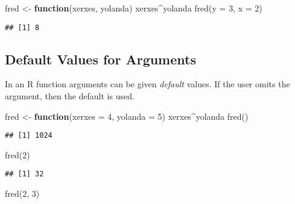\documentclass[
]{article}
\newenvironment{Shaded}{\begin{snugshade}}{\end{snugshade}}
\newcommand{\AttributeTok}[1]{\textcolor[rgb]{0.77,0.63,0.00}{#1}}
\newcommand{\ControlFlowTok}[1]{\textcolor[rgb]{0.13,0.29,0.53}{\textbf{#1}}}
\newcommand{\DecValTok}[1]{\textcolor[rgb]{0.00,0.00,0.81}{#1}}
\newcommand{\FunctionTok}[1]{\textcolor[rgb]{0.00,0.00,0.00}{#1}}
\newcommand{\NormalTok}[1]{#1}
\newcommand{\OtherTok}[1]{\textcolor[rgb]{0.56,0.35,0.01}{#1}}
\newcommand{\SpecialCharTok}[1]{\textcolor[rgb]{0.00,0.00,0.00}{#1}}
\begin{document}
\begin{Shaded}
\begin{Highlighting}[]
\NormalTok{fred }\OtherTok{\textless{}{-}} \ControlFlowTok{function}\NormalTok{(xerxes, yolanda) xerxes}\SpecialCharTok{\^{}}\NormalTok{yolanda}
\FunctionTok{fred}\NormalTok{(}\AttributeTok{y =} \DecValTok{3}\NormalTok{, }\AttributeTok{x =} \DecValTok{2}\NormalTok{)}
\end{Highlighting}
\end{Shaded}

\begin{verbatim}
## [1] 8
\end{verbatim}

\hypertarget{default-values-for-arguments}{%
\subsection{Default Values for
Arguments}\label{default-values-for-arguments}}

In an R function arguments can be given \emph{default} values. If the
user omits the argument, then the default is used.

\begin{Shaded}
\begin{Highlighting}[]
\NormalTok{fred }\OtherTok{\textless{}{-}} \ControlFlowTok{function}\NormalTok{(}\AttributeTok{xerxes =} \DecValTok{4}\NormalTok{, }\AttributeTok{yolanda =} \DecValTok{5}\NormalTok{) xerxes}\SpecialCharTok{\^{}}\NormalTok{yolanda}
\FunctionTok{fred}\NormalTok{()}
\end{Highlighting}
\end{Shaded}

\begin{verbatim}
## [1] 1024
\end{verbatim}

\begin{Shaded}
\begin{Highlighting}[]
\FunctionTok{fred}\NormalTok{(}\DecValTok{2}\NormalTok{)}
\end{Highlighting}
\end{Shaded}

\begin{verbatim}
## [1] 32
\end{verbatim}

\begin{Shaded}
\begin{Highlighting}[]
\FunctionTok{fred}\NormalTok{(}\DecValTok{2}\NormalTok{, }\DecValTok{3}\NormalTok{)}
\end{Highlighting}
\end{Shaded}
\end{document}
